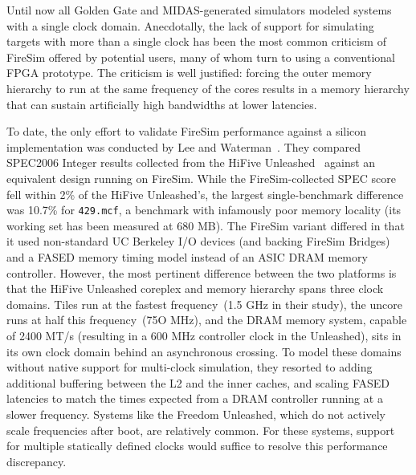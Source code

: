 

Until now all Golden Gate and MIDAS-generated simulators modeled systems with a
single clock domain. Anecdotally, the lack of support for simulating targets
with more than a single clock has been the most common criticism of FireSim
offered by potential users, many of whom turn to using a conventional FPGA
prototype. The criticism is well justified: forcing the outer memory hierarchy
to run at the same frequency of the cores results in a memory hierarchy that
can sustain artificially high bandwidths at lower latencies.

To date, the only effort to validate FireSim performance against a silicon
implementation was conducted by Lee and Waterman~\cite{VLSIFireSimEval}. They
compared SPEC2006 Integer results collected from the HiFive
Unleashed~\cite{HiFiveUnleashed} against an equivalent design running on
FireSim. While the FireSim-collected SPEC score fell within 2\% of the
HiFive Unleashed's, the largest single-benchmark difference was 10.7\% for \texttt{429.mcf}, a
benchmark with infamously poor memory locality (its working set has been
measured at 680 MB\cite{SPEC2006WorkingSet}). The FireSim variant differed in that
it used non-standard UC Berkeley I/O devices (and backing FireSim Bridges) and a
FASED memory timing model instead of an ASIC DRAM memory controller.
However, the most pertinent difference between the two platforms is that the
HiFive Unleashed coreplex and memory hierarchy spans three clock domains. Tiles
run at the fastest frequency~(1.5 GHz in their study), the uncore runs at half
this frequency~(75O MHz), and the DRAM memory system, capable of 2400 MT/s
(resulting in a 600 MHz controller clock in the Unleashed), sits in its
own clock domain behind an asynchronous crossing\cite{FreedomU540}. To model
these domains without native support for multi-clock simulation, they resorted
to adding additional buffering between the L2 and the inner caches, and scaling
FASED latencies to match the times expected from a DRAM controller
running at a slower frequency. Systems like the Freedom Unleashed, which do not actively scale frequencies
after boot, are relatively common. For these systems, support for multiple statically defined clocks
would suffice to resolve this performance discrepancy.

